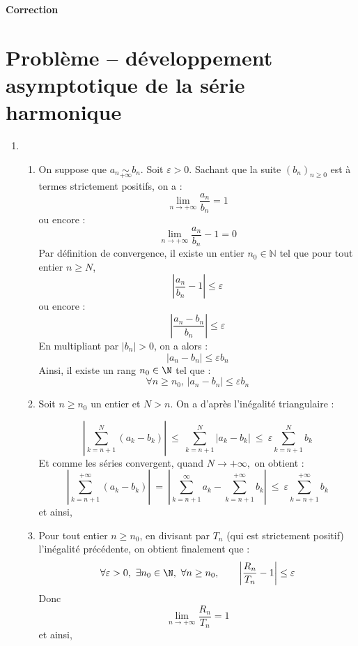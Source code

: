 \documentclass[a4paper,twoside,french,10pt]{VcCours}
\begin{document}

\begin{center}
\large\bf
Correction
\end{center}
\separationTitre


\section*{Problème -- développement asymptotique de la série harmonique}

\begin{enumerate}

    \item 
        
        \begin{enumerate}
            \item On suppose que $a_n \mathop{\sim}\limits_{+\infty} b_n$. Soit $\varepsilon>0$. Sachant que la suite $(b_n)_{n \geq 0}$ est à termes strictement positifs, on a :
    $$ \lim_{n \rightarrow + \infty} \dfrac{a_n}{b_n} =1$$
    ou encore :
    $$ \lim_{n \rightarrow + \infty} \dfrac{a_n}{b_n} -1= 0$$
    Par définition de convergence, il existe un entier $n_0 \in \mathbb{N}$ tel que pour tout entier $n \geq N$,
    $$ \left\vert  \dfrac{a_n}{b_n} -1 \right\vert \leq \varepsilon$$
    ou encore :
    $$ \left\vert  \dfrac{a_n-b_n}{b_n}  \right\vert \leq \varepsilon$$
    En multipliant par $\vert b_n \vert>0$, on a alors :
    $$ |a_n-b_n|\leq \varepsilon b_n$$
    Ainsi, il existe un rang $n_0\in\N$ tel que :
            $$\boxed{\forall n\geq n_0,\, |a_n-b_n|\leq \varepsilon b_n}$$
            
            \item Soit $n\geq n_0$ un entier et $N>n$. On a d'après l'inégalité triangulaire : 
    
    $$\left|\sum_{k=n+1}^{N} (a_k-b_k)\right| \ \leq \ \sum_{k=n+1}^{N} |a_k-b_k|
    \ \leq \ \varepsilon \sum_{k=n+1}^{N} b_k$$
    Et comme les s\'eries convergent, quand $N\rightarrow +\infty,$ on obtient : 
    $$\left|\sum_{k=n+1}^{+\infty} (a_k-b_k)\right|\ =\ \left|\sum_{k=n+1}^{\infty} a_k-\sum_{k=n+1}^{+\infty} b_k\right|\ \leq\ \varepsilon \sum_{k=n+1}^{+\infty} b_k$$
    et ainsi, 
    \item Pour tout entier $n \geq n_0$, en divisant par $T_n$ (qui est strictement positif) l'inégalité précédente, on obtient finalement que :
    $$\forall \varepsilon>0, \ \exists n_0\in\N,\ \forall n\geq n_0,\qquad \left|\frac{R_n}{T_n}-1\right|\leq \varepsilon$$ 
    Donc
    $$\lim_{n\to+\infty}\frac{R_n}{T_n}=1$$
    et ainsi, 
        \end{enumerate}
        

\end{enumerate}
\end{document}
